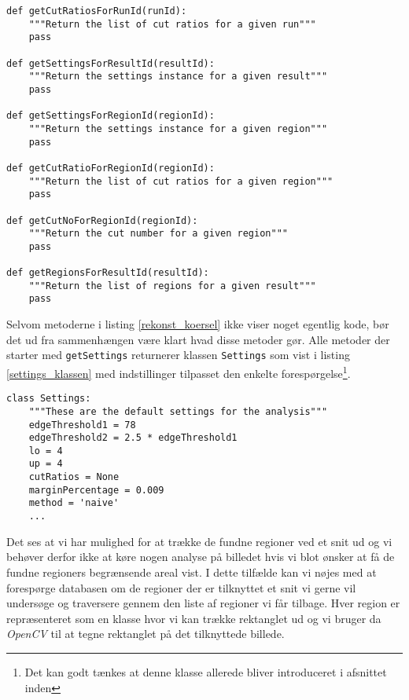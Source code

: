 {\begin{lstlisting}[caption={Metoder til rekonstruktion af kørsler},captionpos=b,label={rekonst_koersel},numbers=none]
def getCutRatiosForRunId(runId):
    """Return the list of cut ratios for a given run"""
    pass

def getSettingsForResultId(resultId):
    """Return the settings instance for a given result"""
    pass

def getSettingsForRegionId(regionId):
    """Return the settings instance for a given region"""
    pass

def getCutRatioForRegionId(regionId):
    """Return the list of cut ratios for a given region"""
    pass

def getCutNoForRegionId(regionId):
    """Return the cut number for a given region"""
    pass

def getRegionsForResultId(resultId):
    """Return the list of regions for a given result"""
    pass
\end{lstlisting}

Selvom metoderne i listing \ref{rekonst_koersel} ikke viser noget
egentlig kode, bør det ud fra sammenhængen være klart hvad disse metoder
gør. Alle metoder der starter med \texttt{getSettings} returnerer
klassen \texttt{Settings} som vist i listing \ref{settings_klassen} med
indstillinger tilpasset den enkelte forespørgelse\footnote{Det kan godt tænkes
at denne klasse allerede bliver introduceret i afsnittet inden}.

\vspace{0.5cm}
\begin{lstlisting}[caption={Settings-klassen med standardindstillinger},captionpos=b,label={settings_klassen},numbers=none]
class Settings:
    """These are the default settings for the analysis"""
    edgeThreshold1 = 78
    edgeThreshold2 = 2.5 * edgeThreshold1
    lo = 4
    up = 4
    cutRatios = None
    marginPercentage = 0.009
    method = 'naive'
    ...
\end{lstlisting}

Det ses at vi har mulighed for at trække de fundne regioner ved et
snit ud og vi behøver derfor ikke at køre nogen analyse på billedet hvis
vi blot ønsker at få de fundne regioners begrænsende areal vist. I dette
tilfælde kan vi nøjes med at forespørge databasen om de regioner der er
tilknyttet et snit vi gerne vil undersøge og traversere gennem den liste
af regioner vi får tilbage. Hver region er repræsenteret som en klasse
hvor vi kan trække rektanglet ud og vi bruger da \emph{OpenCV} til at
tegne rektanglet på det tilknyttede billede.

}
